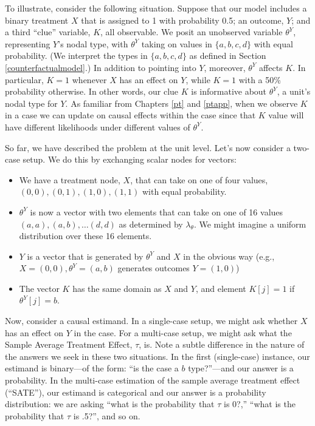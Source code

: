\documentclass[
  12pt,
]{book}
\providecommand{\tightlist}{%
  \setlength{\itemsep}{0pt}\setlength{\parskip}{0pt}}
\begin{document}
To illustrate, consider the following situation. Suppose that our model includes a binary treatment \(X\) that is assigned to 1 with probability 0.5; an outcome, \(Y\); and a third ``clue'' variable, \(K\), all observable. We posit an unobserved variable \(\theta^Y\), representing \(Y\)'s nodal type, with \(\theta^Y\) taking on values in \(\{a,b,c,d\}\) with equal probability. (We interpret the types in \(\{a,b,c,d\}\) as defined in Section \ref{counterfactualmodel}.) In addition to pointing into \(Y\), moreover, \(\theta^Y\) affects \(K\). In particular, \(K=1\) whenever \(X\) has an effect on \(Y\), while \(K=1\) with a 50\% probability otherwise. In other words, our clue \(K\) is informative about \(\theta^Y\), a unit's nodal type for \(Y\). As familiar from Chapters \ref{pt} and \ref{ptapp}, when we observe \(K\) in a case we can update on causal effects within the case since that \(K\) value will have different likelihoods under different values of \(\theta^Y\).

So far, we have described the problem at the unit level. Let's now consider a two-case setup. We do this by exchanging scalar nodes for vectors:

\begin{itemize}
\tightlist
\item
  We have a treatment node, \(X\), that can take on one of four values, \((0,0), (0,1), (1,0), (1,1)\) with equal probability.
\item
  \(\theta^Y\) is now a vector with two elements that can take on one of 16 values \((a,a), (a,b),\dots (d,d)\) as determined by \(\lambda_\theta\). We might imagine a uniform distribution over these 16 elements.
\item
  \(Y\) is a vector that is generated by \(\theta^Y\) and \(X\) in the obvious way (e.g., \(X=(0,0), \theta^Y=(a,b)\) generates outcomes \(Y=(1,0)\))
\item
  The vector \(K\) has the same domain as \(X\) and \(Y\), and element \(K[j]=1\) if \(\theta^Y[j]=b\).
\end{itemize}

Now, consider a causal estimand. In a single-case setup, we might ask whether \(X\) has an effect on \(Y\) in the case. For a multi-case setup, we might ask what the Sample Average Treatment Effect, \(\tau\), is. Note a subtle difference in the nature of the answers we seek in these two situations. In the first (single-case) instance, our estimand is binary---of the form: ``is the case a \(b\) type?''---and our answer is a probability. In the multi-case estimation of the sample average treatment effect (``SATE''), our estimand is categorical and our answer is a probability distribution: we are asking ``what is the probability that \(\tau\) is 0?,'' ``what is the probability that \(\tau\) is .5?'', and so on.
\end{document}
